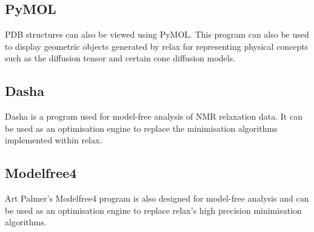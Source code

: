 \subsection{PyMOL}

PDB structures can also be viewed using PyMOL.  This program can also be used to display geometric objects generated by relax for representing physical concepts such as the diffusion tensor and certain cone diffusion models.


\subsection{Dasha}

Dasha is a program used for model-free analysis of NMR relaxation data.  It can be used as an optimisation engine to replace the minimisation algorithms implemented within relax.


\subsection{Modelfree4}

Art Palmer's Modelfree4 program is also designed for model-free analysis and can be used as an optimisation engine to replace relax's high precision minimisation algorithms.
